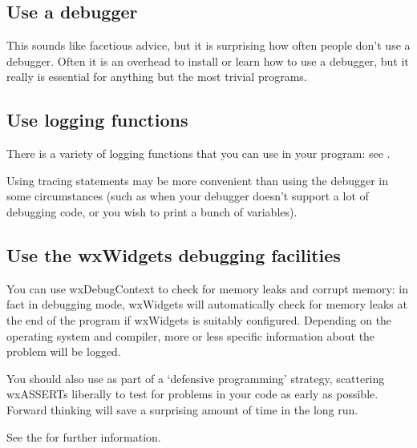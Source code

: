 \subsection{Use a debugger}\label{usedebugger}

This sounds like facetious advice, but it is surprising how often people
don't use a debugger. Often it is an overhead to install or learn how to
use a debugger, but it really is essential for anything but the most
trivial programs.

\subsection{Use logging functions}\label{uselogging}

There is a variety of logging functions that you can use in your program:
see .

Using tracing statements may be more convenient than using the debugger
in some circumstances (such as when your debugger doesn't support a lot
of debugging code, or you wish to print a bunch of variables).

\subsection{Use the wxWidgets debugging facilities}\label{usedebuggingfacilities}

You can use wxDebugContext to check for
memory leaks and corrupt memory: in fact in debugging mode, wxWidgets will
automatically check for memory leaks at the end of the program if wxWidgets is suitably
configured. Depending on the operating system and compiler, more or less
specific information about the problem will be logged.

You should also use  as part of a `defensive programming' strategy,
scattering wxASSERTs liberally to test for problems in your code as early as possible. Forward thinking
will save a surprising amount of time in the long run.

See the  for further information.


